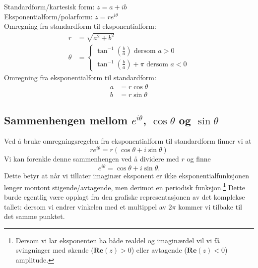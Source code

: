\documentclass[a4paper,norsk,12pt]{article}
\begin{document}
\begin{tsummary}
Standardform/kartesisk form: $z = a + ib$ \\
Eksponentialform/polarform: $z = re^{i\theta}$ \\[12pt]

Omregning fra standardform til eksponentialform:
\begin{align*}
	r &= \sqrt{a^2+b^2} \\
	\theta &= \begin{cases} 
		\tan^{-1}\left(\frac{b}{a}\right) \text{ dersom } a>0 \\
		\tan^{-1}\left(\frac{b}{a}\right)+\pi \text{ dersom } a <0
	\end{cases}
\end{align*}
Omregning fra eksponentialform til standardform:
\begin{align*}
	a &= r\cos\theta \\
	b &= r\sin\theta
\end{align*}
\end{tsummary}

\subsection{Sammenhengen mellom $e^{i\theta}$, $\cos\theta$ og $\sin\theta$}
Ved å bruke omregningsregelen fra eksponentialform til standardform finner vi at
\begin{displaymath}
	re^{i\theta} = r(\cos\theta + i\sin\theta)
\end{displaymath}
Vi kan forenkle denne sammenhengen ved å dividere med $r$ og finne
\begin{equation}
	\label{kompleks:eq:eitheta}
	e^{i\theta} = \cos\theta + i\sin\theta.
\end{equation}
Dette betyr at når vi tillater imaginær eksponent er ikke eksponentialfunksjonen lenger montont stigende/avtagende, men derimot en periodisk funksjon.\footnote{Dersom vi lar eksponenten ha både realdel og imaginærdel vil vi få svingninger med økende ($\mathbf{Re}(z)>0$) eller avtagende ($\mathbf{Re}(z)<0$) amplitude.} Dette burde egentlig være opplagt fra den grafiske representasjonen av det komplekse tallet: dersom vi endrer vinkelen med et multippel av $2\pi$ kommer vi tilbake til det samme punktet. 
\end{document}
